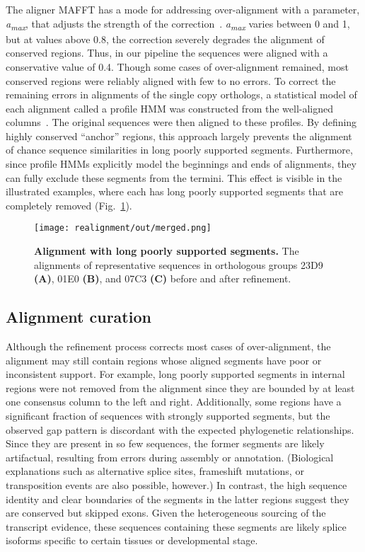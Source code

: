 \documentclass[10pt,letterpaper]{article}
\begin{document}
The aligner MAFFT has a mode for addressing over-alignment with a parameter, \textit{a\textsubscript{max}}, that adjusts the strength of the correction~\cite{Katoh2013, Katoh2016}. \textit{a\textsubscript{max}} varies between 0 and 1, but at values above 0.8, the correction severely degrades the alignment of conserved regions. Thus, in our pipeline the sequences were aligned with a conservative value of 0.4. Though some cases of over-alignment remained, most conserved regions were reliably aligned with few to no errors. To correct the remaining errors in alignments of the single copy orthologs, a statistical model of each alignment called a profile HMM was constructed from the well-aligned columns~\cite{Eddy2009}. The original sequences were then aligned to these profiles. By defining highly conserved “anchor” regions, this approach largely prevents the alignment of chance sequence similarities in long poorly supported segments. Furthermore, since profile HMMs explicitly model the beginnings and ends of alignments, they can fully exclude these segments from the termini. This effect is visible in the illustrated examples, where each has long poorly supported segments that are completely removed (Fig.~\ref{fig:realignment}).

\begin{figure}[h!]
\texttt{[image: realignment/out/merged.png]}
\centering
\caption{\textbf{Alignment with long poorly supported segments.}
The alignments of representative sequences in orthologous groups 23D9 \textbf{(A)}, 01E0 \textbf{(B)}, and 07C3 \textbf{(C)} before and after refinement.}
\label{fig:realignment}
\end{figure}

\subsection*{Alignment curation}
Although the refinement process corrects most cases of over-alignment, the alignment may still contain regions whose aligned segments have poor or inconsistent support. For example, long poorly supported segments in internal regions were not removed from the alignment since they are bounded by at least one consensus column to the left and right. Additionally, some regions have a significant fraction of sequences with strongly supported segments, but the observed gap pattern is discordant with the expected phylogenetic relationships. Since they are present in so few sequences, the former segments are likely artifactual, resulting from errors during assembly or annotation. (Biological explanations such as alternative splice sites, frameshift mutations, or transposition events are also possible, however.) In contrast, the high sequence identity and clear boundaries of the segments in the latter regions suggest they are conserved but skipped exons. Given the heterogeneous sourcing of the transcript evidence, these sequences containing these segments are likely splice isoforms specific to certain tissues or developmental stage.
\end{document}
